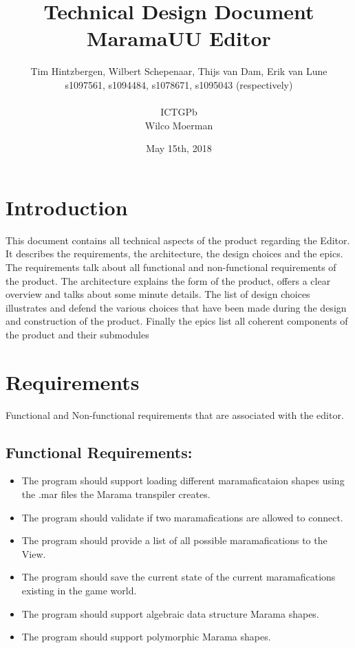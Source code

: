 \documentclass[10pt]{extarticle} %
\title{\huge Technical Design Document MaramaUU Editor}
\author{Tim Hintzbergen, Wilbert Schepenaar, Thijs van Dam, Erik van Lune    \\s1097561, s1094484, s1078671, s1095043 (respectively)
\\\\ICTGPb
\\Wilco Moerman}
\date{May 15th, 2018}
\begin{document}
    \nocite{*}
    \maketitle
    \thispagestyle{empty}
    \newpage
    \newpage
    \setcounter{page}{1}
    \section {Introduction}
    This document contains all technical aspects of the product regarding the Editor.
    It describes the requirements, the architecture, the design choices and the epics.
    The requirements talk about all functional and non-functional requirements of the product.
    The architecture explains the form of the product, offers a clear overview and talks about some minute details.
    The list of design choices illustrates and defend the various choices that have been made during the design and construction of the product.
    Finally the epics list all coherent components of the product and their submodules
    \newpage

    \tableofcontents{}
    \newpage

    \section{Requirements}
    Functional and Non-functional requirements that are associated with the editor.
    \subsection{Functional Requirements:}
    \begin{itemize}
        \item The program should support loading different maramaficataion shapes using the .mar files the Marama transpiler creates.
        \item The program should validate if two maramafications are allowed to connect.
        \item The program should provide a list of all possible maramafications to the View.
        \item The program should save the current state of the current maramafications existing in the game world.
        \item The program should support algebraic data structure Marama shapes.
        \item The program should support polymorphic Marama shapes.
    \end{itemize}
\end{document}
